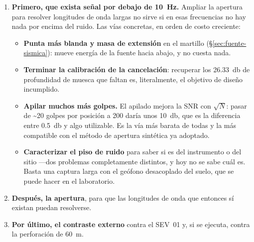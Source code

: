 \begin{enumerate}[itemsep=0.2em]
    \item \textbf{Primero, que exista se\~nal por debajo de \SI{10}{\hertz}.}
    Ampliar la apertura para resolver longitudes de onda largas no sirve si en
    esas frecuencias no hay nada por encima del ruido. Las v\'ias concretas, en
    orden de costo creciente:
    \begin{itemize}[itemsep=0.1em]
        \item \textbf{Punta m\'as blanda y masa de extensi\'on} en el martillo
        (\S\ref{sec:fuente-sismica}): mueve energ\'ia de la fuente hacia abajo,
        y no cuesta nada.
        \item \textbf{Terminar la calibraci\'on de la cancelaci\'on}: recuperar
        los \SI{26.33}{\decibel} de profundidad de muesca que faltan es,
        literalmente, el objetivo de dise\~no incumplido.
        \item \textbf{Apilar muchos m\'as golpes.} El apilado mejora la SNR con
        $\sqrt{N}$: pasar de \textasciitilde{}20 golpes por posici\'on a 200
        dar\'ia unos \SI{10}{\decibel}, que es la diferencia entre
        \SI{0.5}{\decibel} y algo utilizable. Es la v\'ia m\'as barata de todas
        y la m\'as compatible con el m\'etodo de apertura sint\'etica ya adoptado.
        \item \textbf{Caracterizar el piso de ruido} para saber si es del
        instrumento o del sitio ---dos problemas completamente distintos, y hoy
        no se sabe cu\'al es. Basta una captura larga con el ge\'ofono
        desacoplado del suelo, que se puede hacer en el laboratorio.
    \end{itemize}
    \item \textbf{Despu\'es, la apertura}, para que las longitudes de onda que
    entonces s\'i existan puedan resolverse.
    \item \textbf{Por \'ultimo, el contraste externo} contra el SEV~01 y, si se
    ejecuta, contra la perforaci\'on de \SI{60}{\meter}.
\end{enumerate}

